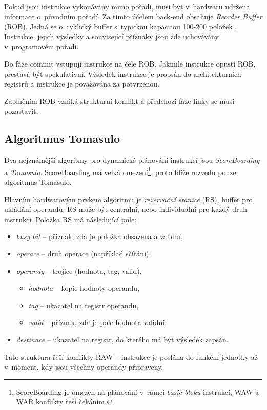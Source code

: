 Pokud jsou instrukce vykonávány mimo pořadí, musí být v~hardwaru udržena informace o~původním pořadí.
Za tímto účelem back-end obsahuje \emph{Reorder Buffer} (ROB).
Jedná se o~cyklický buffer s~typickou kapacitou 100-200 položek \cite{avs}.
Instrukce, jejich výsledky a související příznaky jsou zde uchovávány v~programovém pořadí.

Do fáze commit vstupují instrukce na čele ROB.
Jakmile instrukce opustí ROB, přestává být spekulativní.
Výsledek instrukce je propsán do architekturních registrů a instrukce je považována za potvrzenou.

Zaplněním ROB vzniká strukturní konflikt a předchozí fáze linky se musí pozastavit.

\subsection{Algoritmus Tomasulo}

Dva nejznámější algoritmy pro dynamické plánování instrukcí jsou \emph{ScoreBoarding} a \emph{Tomasulo}.
ScoreBoarding má velká omezení\footnote{ScoreBoarding je omezen na plánování v~rámci \emph{basic bloku} instrukcí, WAW a WAR konflikty řeší čekáním.}, proto blíže rozvedu pouze algoritmus Tomasulo.

Hlavním hardwarovým prvkem algoritmu je \emph{rezervační stanice} (RS), buffer pro ukládání operandů.
RS může být centrální, nebo individuální pro každý druh instrukcí.
Položka RS má následující pole:
\begin{itemize}
    \item \emph{busy bit}  -- příznak, zda je položka obsazena a validní,
    \item \emph{operace}   -- druh operace (například sčítání),
    \item \emph{operandy}  -- trojice (hodnota, tag, valid),
    \begin{itemize}
        \item \emph{hodnota} -- kopie hodnoty operandu,
        \item \emph{tag}     -- ukazatel na registr operandu,
        \item \emph{valid}   -- příznak, zda je pole hodnota validní,
    \end{itemize}
    \item \emph{destinace} -- ukazatel na registr, do kterého má být výsledek zapsán.
\end{itemize}
Tato struktura řeší konflikty RAW -- instrukce je poslána do funkční jednotky až v~moment, kdy jsou všechny operandy připraveny.

